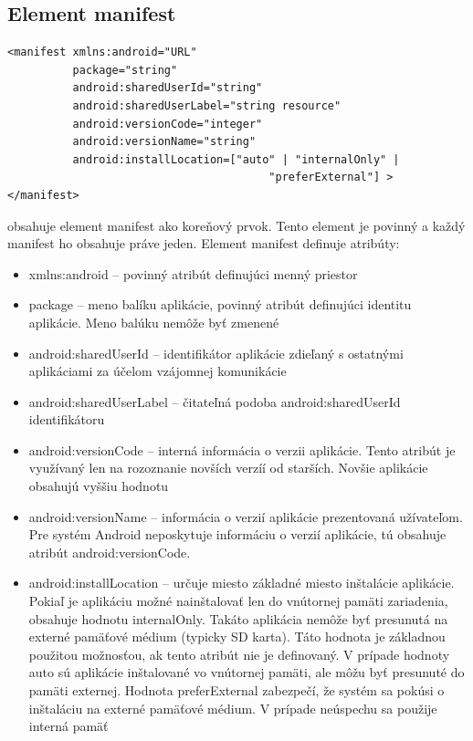 \subsection{Element manifest}
\label{el_manifest}
\lstset{language=XML}
\begin{lstlisting}
<manifest xmlns:android="URL"
          package="string"
          android:sharedUserId="string"
          android:sharedUserLabel="string resource"
          android:versionCode="integer"
          android:versionName="string"
          android:installLocation=["auto" | "internalOnly" |
                                        "preferExternal"] >
</manifest>
\end{lstlisting}
 obsahuje element manifest ako koreňový prvok. Tento element je povinný a každý manifest ho obsahuje práve jeden. \newline\newline
\noindent Element manifest definuje atribúty:\\
\begin{itemize}
\item xmlns:android – povinný atribút definujúci menný priestor
\item package – meno balíku aplikácie, povinný atribút definujúci identitu aplikácie. Meno balúku nemôže byť zmenené
\item android:sharedUserId – identifikátor aplikácie zdieľaný s ostatnými aplikáciami za účelom vzájomnej komunikácie
\item android:sharedUserLabel – čitateľná podoba android:sharedUserId identifikátoru
\item android:versionCode – interná informácia o verzii aplikácie. Tento atribút je využívaný len na rozoznanie novších verzíí od starších. Novšie aplikácie obsahujú vyššiu hodnotu
\item android:versionName – informácia o verzií aplikácie prezentovaná užívateľom. Pre systém Android neposkytuje informáciu o verzií aplikácie, tú obsahuje atribút android:versionCode.
\item android:installLocation – určuje miesto základné miesto inštalácie aplikácie. Pokiaľ je aplikáciu možné nainštalovať len do vnútornej pamäti zariadenia, obsahuje hodnotu internalOnly. Takáto aplikácia nemôže byť presunutá na externé pamäťové médium (typicky SD karta). Táto hodnota je základnou použitou možnosťou, ak tento atribút nie je definovaný. V prípade hodnoty auto sú aplikácie inštalované vo vnútornej pamäti, ale môžu byť presunuté do pamäti externej. Hodnota preferExternal zabezpečí, že systém sa pokúsi o inštaláciu na externé pamäťové médium. V prípade neúspechu sa použije interná pamäť
\end{itemize}

